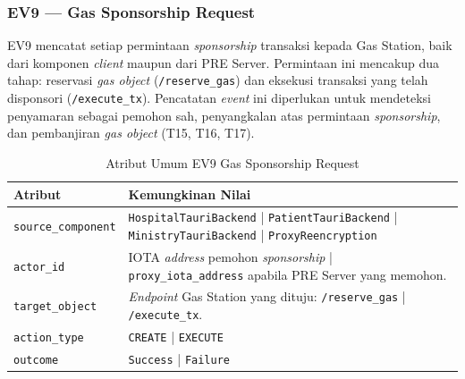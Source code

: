 \subsubsection{EV9 --- Gas Sponsorship Request}
\label{subsec:ev9-gas-sponsorship}

EV9 mencatat setiap permintaan \textit{sponsorship} transaksi kepada Gas
Station, baik dari komponen \textit{client} maupun dari PRE Server. Permintaan
ini mencakup dua tahap: reservasi \textit{gas object} (\texttt{/reserve\_gas})
dan eksekusi transaksi yang telah disponsori (\texttt{/execute\_tx}).
Pencatatan \textit{event} ini diperlukan untuk mendeteksi penyamaran sebagai
pemohon sah, penyangkalan atas permintaan \textit{sponsorship}, dan
pembanjiran \textit{gas object} (T15, T16, T17).

\begin{table}[htbp]
\centering
\caption{Atribut Umum EV9 Gas Sponsorship Request}
\label{tab:ev9-umum}
\renewcommand{\arraystretch}{1.3}
\begin{tabular}{|p{3.5cm}|p{8.5cm}|}
\hline
\textbf{Atribut} & \textbf{Kemungkinan Nilai} \\
\hline
\texttt{source\_component} &
\texttt{HospitalTauriBackend} | \texttt{PatientTauriBackend} |
\texttt{MinistryTauriBackend} | \texttt{ProxyReencryption} \\
\hline
\texttt{actor\_id} &
IOTA \textit{address} pemohon \textit{sponsorship} |
\texttt{proxy\_iota\_address} apabila PRE Server yang memohon. \\
\hline
\texttt{target\_object} &
\textit{Endpoint} Gas Station yang dituju: \texttt{/reserve\_gas} |
\texttt{/execute\_tx}. \\
\hline
\texttt{action\_type} &
\texttt{CREATE} | \texttt{EXECUTE} \\
\hline
\texttt{outcome} &
\texttt{Success} | \texttt{Failure} \\
\hline
\end{tabular}
\end{table}

